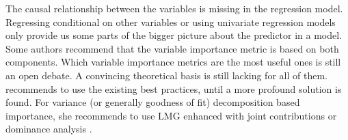 \documentclass[11pt,a4paper,twoside]{book}
\begin{document}
The causal relationship between the variables is missing in the regression model. Regressing conditional on  other variables or using univariate regression models only provide us some parts of the bigger picture about the predictor in a model. Some authors recommend that the variable importance metric is based on both components.  Which variable importance metrics are the most useful ones is still an open debate. A convincing theoretical basis is still lacking for all of them.  \cite{Gromping2015} recommends to use the existing best practices, until a more profound solution is found. For variance (or generally goodness of fit) decomposition based importance, she recommends to use LMG enhanced with joint contributions or dominance analysis \citep{Gromping2007}.  
 

\end{document}
